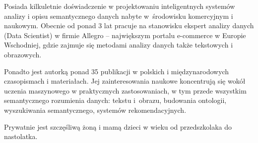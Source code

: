 \documentclass[\main/boa.tex]{subfiles}
\begin{document}
Posiada kilkuletnie doświadczenie w projektowaniu inteligentnych systemów analizy i opisu semantycznego danych nabyte w~środowisku komercyjnym i naukowym. Obecnie od ponad 3 lat pracuje na stanowisku ekspert analizy danych (Data Scientist) w firmie Allegro – największym portalu e-commerce w Europie Wschodniej, gdzie zajmuje się metodami analizy danych także tekstowych i obrazowych.

Ponadto jest autorką ponad 35 publikacji w polskich i międzynarodowych czasopismach i materiałach. Jej zainteresowania naukowe koncentrują się wokół uczenia maszynowego w praktycznych zastosowaniach, w tym przede wszystkim semantycznego rozumienia danych: tekstu i~obrazu, budowania ontologii, wyszukiwania semantycznego, systemów rekomendacyjnych. 

Prywatnie jest szczęśliwą żoną i mamą dzieci w wieku od przedszkolaka do nastolatka.
\end{document}
